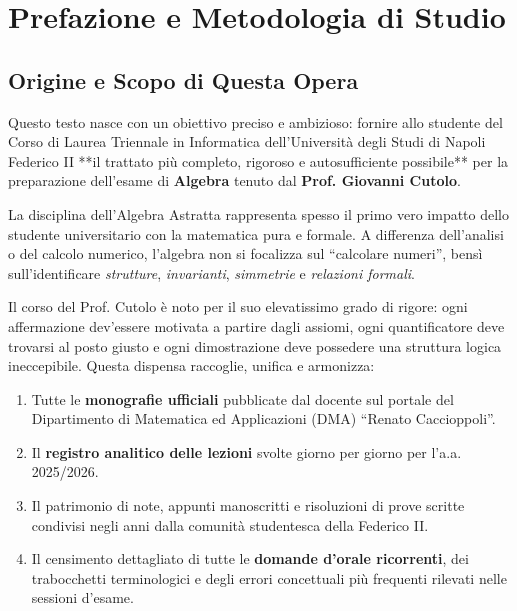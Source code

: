 \chapter*{Prefazione e Metodologia di Studio}

\section*{Origine e Scopo di Questa Opera}
Questo testo nasce con un obiettivo preciso e ambizioso: fornire allo studente del Corso di Laurea Triennale in Informatica dell'Università degli Studi di Napoli Federico II **il trattato più completo, rigoroso e autosufficiente possibile** per la preparazione dell'esame di \textbf{Algebra} tenuto dal \textbf{Prof. Giovanni Cutolo}.

La disciplina dell'Algebra Astratta rappresenta spesso il primo vero impatto dello studente universitario con la matematica pura e formale. A differenza dell'analisi o del calcolo numerico, l'algebra non si focalizza sul ``calcolare numeri'', bensì sull'identificare \emph{strutture}, \emph{invarianti}, \emph{simmetrie} e \emph{relazioni formali}.

Il corso del Prof. Cutolo è noto per il suo elevatissimo grado di rigore: ogni affermazione dev'essere motivata a partire dagli assiomi, ogni quantificatore deve trovarsi al posto giusto e ogni dimostrazione deve possedere una struttura logica ineccepibile. Questa dispensa raccoglie, unifica e armonizza:
\begin{enumerate}
    \item Tutte le \textbf{monografie ufficiali} pubblicate dal docente sul portale del Dipartimento di Matematica ed Applicazioni (DMA) ``Renato Caccioppoli''.
    \item Il \textbf{registro analitico delle lezioni} svolte giorno per giorno per l'a.a. 2025/2026.
    \item Il patrimonio di note, appunti manoscritti e risoluzioni di prove scritte condivisi negli anni dalla comunità studentesca della Federico II.
    \item Il censimento dettagliato di tutte le \textbf{domande d'orale ricorrenti}, dei trabocchetti terminologici e degli errori concettuali più frequenti rilevati nelle sessioni d'esame.
\end{enumerate}

